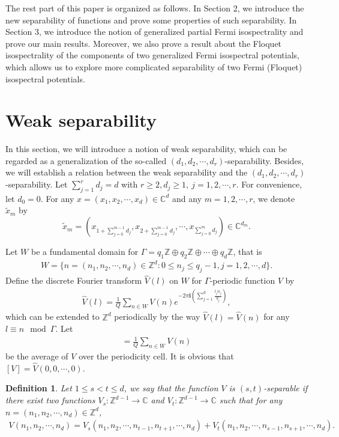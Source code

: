 \documentclass[12pt,letterpaper]{amsart}
\newtheorem{definition}{Definition}[section]
\begin{document}
The rest part of this paper is organized as follows. In Section 2, we introduce the new separability of functions and prove some properties of such separability. In Section 3, we introduce the notion of generalized partial Fermi isospectrality and prove our main results.
Moreover, we also prove a result about the Floquet isospectrality of the components of two generalized Fermi isospectral potentials, which allows us to explore more complicated separability of two Fermi (Floquet) isospectral potentials.

\section{Weak separability}
\setcounter{equation}{0}
In this section, we will introduce a notion of weak separability, which can be regarded as a generalization of the so-called $(d_1,d_2,\cdots,d_r)$-separability. Besides, we will establish a relation between the weak separability and the $(d_1,d_2,\cdots,d_r)$-separability. Let $\sum_{j=1}^rd_j=d$ with $r\geq 2,d_j\geq1,\ j=1,2,\cdots,r$. For convenience, let $d_0=0$. For any $x=(x_1,x_2,\cdots,x_d)\in\mathbb{C}^d$ and any $m=1,2,\cdots,r$, we denote $\tilde{x}_m$ by
$$\tilde{x}_m=\left(x_{1+\sum_{j=0}^{m-1}d_j},x_{2+\sum_{j=0}^{m-1}d_j},\cdots,x_{\sum_{j=0}^{m}d_j}\right)\in \mathbb{C}^{d_m}.$$


Let $W$ be a fundamental domain for $\Gamma=q_1\mathbb{Z}\oplus q_2\mathbb{Z}\oplus \cdots\oplus q_d\mathbb{Z}$, that is
\begin{align}
W=\{n=(n_1,n_2,\cdots,n_d)\in\mathbb{Z}^d:0\leq n_j\leq q_j-1,j=1,2,\cdots,d\}.\nonumber
\end{align}
Define the discrete Fourier transform $\hat{V}(l)$ on $W$ for $\Gamma$-periodic function $V$ by
\begin{align}
\hat{V}(l)=\frac{1}{Q}\sum_{n\in W}V(n)e^{-2\pi \mathbf{i}\left(\sum_{j=1}^d\frac{l_jn_j}{q_j}\right)},\nonumber
\end{align}
which can be extended to $\mathbb{Z}^d$ periodically by the way $\hat{V}(l)=\hat{V}(n)$
for any $l\equiv n\mod\Gamma$. Let
\begin{align}
[V]=\frac{1}{Q}\sum_{n\in W}V(n)\nonumber
\end{align}
be the average of $V$ over the periodicity cell. It is obvious that $[V]=\hat{V}(0,0,\cdots,0)$.




\begin{definition}\label{defstsep}
Let
$1\leq s<t\leq d$, we say that the function $V$ is $(s,t)$-separable if there exist two functions $V_s:\mathbb{Z}^{d-1}\to\mathbb{C}$ and $V_t:\mathbb{Z}^{d-1}\to\mathbb{C}$ such that for any $n=(n_1,n_2,\cdots,n_d)\in\mathbb{Z}^d$,
\begin{align}
V(n_1,n_2,\cdots,n_d)=V_s({n}_1,{n}_2,\cdots,{n}_{t-1},{n}_{t+1},\cdots,{n}_d)+V_t({n}_1,{n}_2,\cdots,{n}_{s-1},{n}_{s+1},\cdots,{n}_d).\nonumber
\end{align}
\end{definition}
\end{document}
